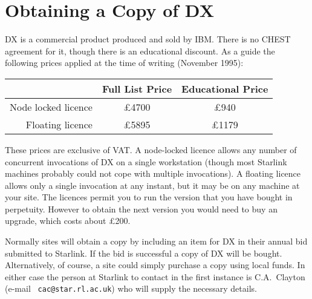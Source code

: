 \section{Obtaining a Copy of DX \label{OBTAIN}  }

DX is a commercial product produced and sold by IBM. There is no CHEST
agreement for it, though there is an educational discount. As a guide 
the following prices applied at the time of writing (November 1995):

\begin{center}
\begin{tabular}{rcc}
                    &  Full List Price &  Educational Price \\ \hline
Node locked licence &  \pounds 4700    & \pounds 940   \\
Floating licence    &  \pounds 5895    & \pounds 1179  \\
\end{tabular}
\end{center}

These prices are exclusive of VAT. A node-locked licence allows any
number of concurrent invocations of DX on a single workstation (though
most Starlink machines probably could not cope with multiple
invocations). A floating licence allows only a single invocation at any
instant, but it may be on any machine at your site. The licences permit 
you to run the version that you have bought in perpetuity. However to 
obtain the next version you would need to buy an upgrade, which costs
about \pounds 200.

Normally sites will obtain a copy by including an item for DX in their
annual bid submitted to Starlink. If the bid is successful a copy of
DX will be bought. Alternatively, of course, a site could simply
purchase a copy using local funds. In either case the person at Starlink 
to contact in the first instance is C.A.~Clayton (e-mail {\tt 
cac@star.rl.ac.uk}) who will supply the necessary details.


\typeout{  }
\typeout{*****************************************************}
\typeout{  }
\typeout{  }
\typeout{*****************************************************}
\typeout{  }


